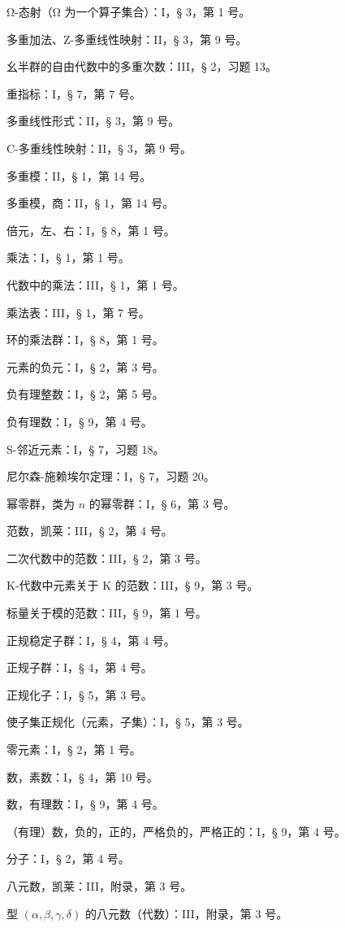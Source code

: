 Ω-态射（Ω 为一个算子集合）：I，§ 3，第 1 号。

多重加法、Z-多重线性映射：II，§ 3，第 9 号。

幺半群的自由代数中的多重次数：III，§ 2，习题 13。

重指标：I，§ 7，第 7 号。

多重线性形式：II，§ 3，第 9 号。

C-多重线性映射：II，§ 3，第 9 号。

多重模：II，§ 1，第 14 号。

多重模，商：II，§ 1，第 14 号。

倍元，左、右：I，§ 8，第 1 号。

乘法：I，§ 1，第 1 号。

代数中的乘法：III，§ 1，第 1 号。

乘法表：III，§ 1，第 7 号。

环的乘法群：I，§ 8，第 1 号。

元素的负元：I，§ 2，第 3 号。

负有理整数：I，§ 2，第 5 号。

负有理数：I，§ 9，第 4 号。

S-邻近元素：I，§ 7，习题 18。

尼尔森-施赖埃尔定理：I，§ 7，习题 20。

幂零群，类为 \(n\) 的幂零群：I，§ 6，第 3 号。

范数，凯莱：III，§ 2，第 4 号。

二次代数中的范数：III，§ 2，第 3 号。

K-代数中元素关于 K 的范数：III，§ 9，第 3 号。

标量关于模的范数：III，§ 9，第 1 号。

正规稳定子群：I，§ 4，第 4 号。

正规子群：I，§ 4，第 4 号。

正规化子：I，§ 5，第 3 号。

使子集正规化（元素，子集）：I，§ 5，第 3 号。

零元素：I，§ 2，第 1 号。

数，素数：I，§ 4，第 10 号。

数，有理数：I，§ 9，第 4 号。

（有理）数，负的，正的，严格负的，严格正的：I，§ 9，第 4 号。

分子：I，§ 2，第 4 号。

八元数，凯莱：III，附录，第 3 号。

型 \((\alpha, \beta, \gamma, \delta)\) 的八元数（代数）：III，附录，第 3 号。

